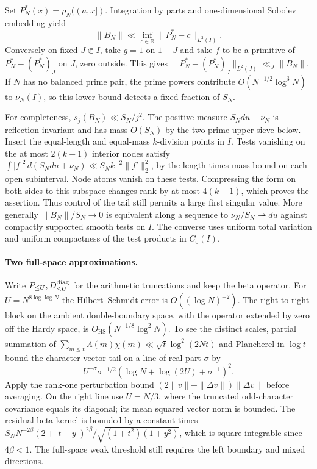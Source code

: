 \documentclass[11pt,a4paper]{article}
\newcommand{\R}{{\mathbb R}}\newcommand{\C}{{\mathbb C}}\newcommand{\Z}{{\mathbb Z}}
\newcommand{\HS}{{\mathrm{HS}}}\newcommand{\sep}{{\mathrm{sep}}}
\begin{document}
Set \(P_N^*(x)=\rho_N((a,x])\). Integration by parts and one-dimensional Sobolev embedding yield
\begin{equation}
 \|B_N\|\ll\inf_{c\in\R}\|P_N^*-c\|_{L^2(I)} .
 \label{eq:cdf}
\end{equation}
Conversely on fixed \(J\Subset I\), take \(g=1\) on \(1-J\) and take \(f\) to be a primitive of \(P_N^*-(P_N^*)_J\) on \(J\), zero outside. This gives \(\|P_N^*-(P_N^*)_J\|_{L^2(J)}\ll_J\|B_N\|\). If \(N\) has no balanced prime pair, the prime powers contribute \(O(N^{-1/2}\log^3 N)\) to \(\nu_N(I)\), so this lower bound detects a fixed fraction of \(S_N\).

For completeness, \(s_j(B_N)\ll S_N/j^2\). The positive measure \(S_Ndu+\nu_N\) is reflection invariant and has mass \(O(S_N)\) by the two-prime upper sieve below. Insert the equal-length and equal-mass \(k\)-division points in \(I\). Tests vanishing on the at most \(2(k-1)\) interior nodes satisfy \(\int |f|^2\,d(S_Ndu+\nu_N)\ll S_N k^{-2}\|f'\|_2^2\), by the length times mass bound on each open subinterval. Node atoms vanish on these tests. Compressing the form on both sides to this subspace changes rank by at most \(4(k-1)\), which proves the assertion. Thus control of the tail still permits a large first singular value. More generally \(\|B_N\|/S_N\to0\) is equivalent along a sequence to \(\nu_N/S_N\rightharpoonup du\) against compactly supported smooth tests on \(I\). The converse uses uniform total variation and uniform compactness of the test products in \(C_0(I)\).

\paragraph{Two full-space approximations.} Write \(P_{\le U},D_{\le U}^{\rm diag}\) for the arithmetic truncations and keep the beta operator. For \(U=N^{8\log\log N}\) the Hilbert--Schmidt error is \(O((\log N)^{-2})\). The right-to-right block on the ambient double-boundary space, with the operator extended by zero off the Hardy space, is \(O_{\HS}(N^{-1/8}\log^2 N)\). To see the distinct scales, partial summation of \(\sum_{m\le t}\Lambda(m)\chi(m)\ll\sqrt t\log^2(2Nt)\) and Plancherel in \(\log t\) bound the character-vector tail on a line of real part \(\sigma\) by
\[
 U^{-\sigma}\sigma^{-1/2}(\log N+\log(2U)+\sigma^{-1})^2 .
\]
Apply the rank-one perturbation bound \((2\|v\|+\|\Delta v\|)\|\Delta v\|\) before averaging. On the right line use \(U=N/3\), where the truncated odd-character covariance equals its diagonal; its mean squared vector norm is bounded. The residual beta kernel is bounded by a constant times \(S_N N^{-2\beta}(2+|t-y|)^{2\beta}/\sqrt{(1+t^2)(1+y^2)}\), which is square integrable since \(4\beta<1\). The full-space weak threshold still requires the left boundary and mixed directions.
\end{document}
